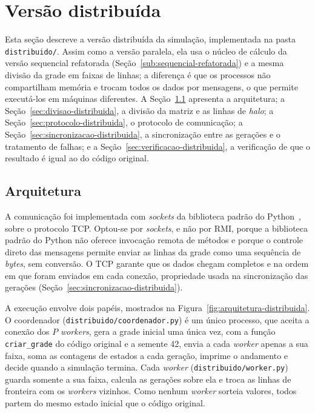 
\chapter{Versão distribuída}\label{cap:distribuida}

Esta seção descreve a versão distribuída da simulação, implementada na pasta \texttt{distribuido/}. Assim como a versão paralela, ela usa o núcleo de cálculo da versão sequencial refatorada (Seção~\ref{sub:sequencial-refatorada}) e a mesma divisão da grade em faixas de linhas; a diferença é que os processos não compartilham memória e trocam todos os dados por mensagens, o que permite executá-los em máquinas diferentes. A Seção~\ref{sec:arquitetura-distribuida} apresenta a arquitetura; a Seção~\ref{sec:divisao-distribuida}, a divisão da matriz e as linhas de \textit{halo}; a Seção~\ref{sec:protocolo-distribuida}, o protocolo de comunicação; a Seção~\ref{sec:sincronizacao-distribuida}, a sincronização entre as gerações e o tratamento de falhas; e a Seção~\ref{sec:verificacao-distribuida}, a verificação de que o resultado é igual ao do código original.

\section{Arquitetura}\label{sec:arquitetura-distribuida}

A comunicação foi implementada com \textit{sockets} da biblioteca padrão do Python~\cite{PythonSocket}, sobre o protocolo \ac{TCP}. Optou-se por \textit{sockets}, e não por \ac{RMI}, porque a biblioteca padrão do Python não oferece invocação remota de métodos e porque o controle direto das mensagens permite enviar as linhas da grade como uma sequência de \textit{bytes}, sem conversão. O \ac{TCP} garante que os dados chegam completos e na ordem em que foram enviados em cada conexão, propriedade usada na sincronização das gerações (Seção~\ref{sec:sincronizacao-distribuida}).

A execução envolve dois papéis, mostrados na Figura~\ref{fig:arquitetura-distribuida}. O coordenador (\texttt{distribuido/coordenador.py}) é um único processo, que aceita a conexão dos $P$ \textit{workers}, gera a grade inicial uma única vez, com a função \texttt{criar\_grade} do código original e a semente 42, envia a cada \textit{worker} apenas a sua faixa, soma as contagens de estados a cada geração, imprime o andamento e decide quando a simulação termina. Cada \textit{worker} (\texttt{distribuido/worker.py}) guarda somente a sua faixa, calcula as gerações sobre ela e troca as linhas de fronteira com os \textit{workers} vizinhos. Como nenhum \textit{worker} sorteia valores, todos partem do mesmo estado inicial que o código original.

